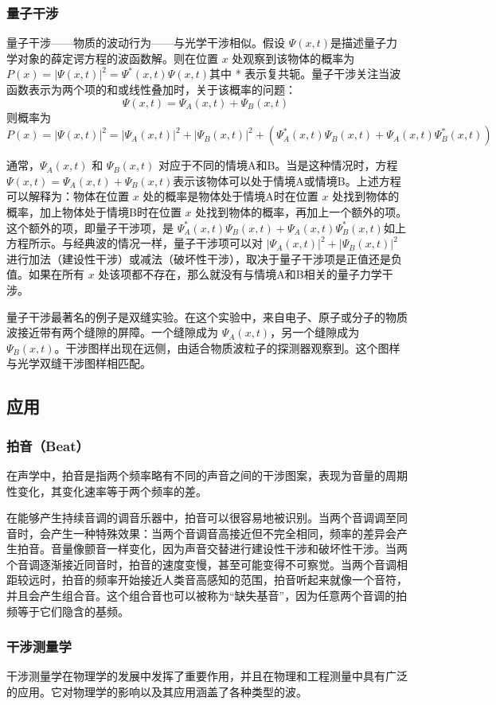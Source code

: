 \subsubsection{量子干涉}
量子干涉——物质的波动行为——与光学干涉相似。假设  \(\Psi(x,t)\)是描述量子力学对象的薛定谔方程的波函数解。则在位置 \(x\) 处观察到该物体的概率为 \(P(x) = |\Psi(x,t)|^2 = \Psi^*(x,t) \Psi(x,t)\)其中 * 表示复共轭。量子干涉关注当波函数表示为两个项的和或线性叠加时，关于该概率的问题：  
\[
\Psi(x,t) = \Psi_A(x,t) + \Psi_B(x,t)~
\]
则概率为  
\[
P(x) = |\Psi(x,t)|^2 = |\Psi_A(x,t)|^2 + |\Psi_B(x,t)|^2 + (\Psi_A^*(x,t) \Psi_B(x,t) + \Psi_A(x,t) \Psi_B^*(x,t))~
\]

通常，\(\Psi_A(x,t)\) 和 \(\Psi_B(x,t)\) 对应于不同的情境A和B。当是这种情况时，方程  \(\Psi(x,t) = \Psi_A(x,t) + \Psi_B(x,t)\)表示该物体可以处于情境A或情境B。上述方程可以解释为：物体在位置 \(x\) 处的概率是物体处于情境A时在位置 \(x\) 处找到物体的概率，加上物体处于情境B时在位置 \(x\) 处找到物体的概率，再加上一个额外的项。这个额外的项，即量子干涉项，是 \(\Psi_A^*(x,t) \Psi_B(x,t) + \Psi_A(x,t) \Psi_B^*(x,t)\)如上方程所示。与经典波的情况一样，量子干涉项可以对 \(|\Psi_A(x,t)|^2 + |\Psi_B(x,t)|^2\)进行加法（建设性干涉）或减法（破坏性干涉），取决于量子干涉项是正值还是负值。如果在所有 \(x\) 处该项都不存在，那么就没有与情境A和B相关的量子力学干涉。

量子干涉最著名的例子是双缝实验。在这个实验中，来自电子、原子或分子的物质波接近带有两个缝隙的屏障。一个缝隙成为 \(\Psi_A(x,t)\)，另一个缝隙成为 \(\Psi_B(x,t)\)。干涉图样出现在远侧，由适合物质波粒子的探测器观察到。这个图样与光学双缝干涉图样相匹配。
\subsection{应用}
\subsubsection{拍音（Beat）}
在声学中，拍音是指两个频率略有不同的声音之间的干涉图案，表现为音量的周期性变化，其变化速率等于两个频率的差。

在能够产生持续音调的调音乐器中，拍音可以很容易地被识别。当两个音调调至同音时，会产生一种特殊效果：当两个音调音高接近但不完全相同，频率的差异会产生拍音。音量像颤音一样变化，因为声音交替进行建设性干涉和破坏性干涉。当两个音调逐渐接近同音时，拍音的速度变慢，甚至可能变得不可察觉。当两个音调相距较远时，拍音的频率开始接近人类音高感知的范围，拍音听起来就像一个音符，并且会产生组合音。这个组合音也可以被称为“缺失基音”，因为任意两个音调的拍频等于它们隐含的基频。
\subsubsection{干涉测量学}
干涉测量学在物理学的发展中发挥了重要作用，并且在物理和工程测量中具有广泛的应用。它对物理学的影响以及其应用涵盖了各种类型的波。